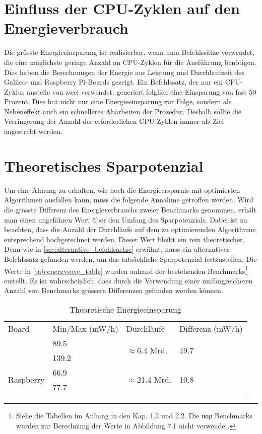 \section{Einfluss der CPU-Zyklen auf den Energieverbrauch}
Die grösste Energieeinsparung ist realisierbar, wenn man Befehlssätze verwendet, die eine möglichste geringe Anzahl an CPU-Zyklen für die Ausführung benötigen. Dies haben die Berechnungen der Energie aus Leistung und Durchlaufzeit   des Galileo- und Raspberry Pi-Boards gezeigt. Ein Befehlssatz, der nur ein CPU-Zyklus anstelle von zwei verwendet, generiert folglich eine Einsparung von fast 50 Prozent. Dies hat nicht nur eine Energieeinsparung zur Folge, sondern als Nebeneffekt auch ein schnelleres Abarbeiten der Prozedur. Deshalb sollte die Verringerung der Anzahl der erforderlichen CPU-Zyklen immer als Ziel angestrebt werden.

\section{Theoretisches Sparpotenzial}
Um eine Ahnung zu erhalten, wie hoch die Energieersparnis mit optimierten Algorithmen ausfallen kann, muss die folgende Annahme getroffen werden. Wird die grösste Differenz des Energieverbrauchs zweier Benchmarks genommen, erhält man einen ungefähren Wert über den Umfang des Sparpotenzials. Dabei ist zu beachten, dass die Anzahl der Durchläufe auf dem zu optimierenden Algorithmus entsprechend hochgerechnet werden. Dieser Wert bleibt ein rein theoretischer. Denn wie in \autoref{sec:alternative_befehlsaetze} erwähnt, muss ein alternativer Befehlssatz gefunden werden, um das tatsächliche Sparpotenzial festzustellen. Die Werte in \autoref{tab:energysave_table} wurden anhand der bestehenden Benchmarks\footnote{Siehe die Tabellen im Anhang in den Kap. 1.2 und 2.2. Die \texttt{nop} Benchmarks wurden zur Berechnung der Werte in Abbildung 7.1 nicht verwendet.} erstellt. Es ist wahrscheinlich, dass durch die Verwendung einer umfangreicheren Anzahl von Benchmarks grössere Differenzen gefunden werden können.


\begin{table}[H]
\center
\begin{tabular}{ |l|l|l|l| }
\hline
Board & Min/Max (mW/h) & Durchläufe & Differenz (mW/h) \\ \hhline{|=|=|=|=|}
\multirow{2}{*}{Galileo} & 89.5 & \multirow{2}{*}{$\approx$6.4 Mrd.} & \multirow{2}{*}{49.7} \\ 
 & 139.2 & &  \\ \hline
\multirow{2}{*}{Raspberry} & 66.9 & \multirow{2}{*}{$\approx$21.4 Mrd.} & \multirow{2}{*}{10.8} \\ 
 & 77.7 & &  \\
\hline
\end{tabular}
\caption{Theoretische Energieeinsparung}
\label{tab:energysave_table}
\end{table}


